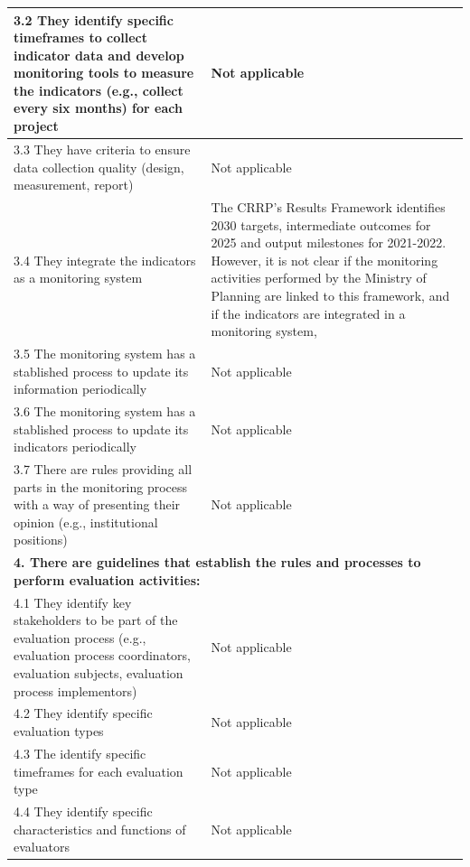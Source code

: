 \documentclass[
  10pt,
]{book}
\begin{document}
\begin{table}
\begin{tabular}[t]{l|l}
\hline
\hspace{1em}3.2 They identify specific timeframes to collect indicator data and develop monitoring tools to measure the indicators (e.g., collect every six months) for each project & Not applicable\\
\hline
\hspace{1em}3.3 They have criteria to ensure data collection quality (design, measurement, report) & Not applicable\\
\hline
\hspace{1em}3.4 They integrate the indicators as a monitoring system & The CRRP’s Results Framework identifies 2030 targets, intermediate outcomes for 2025 and output milestones for 2021-2022. However, it is not clear if the monitoring activities performed by the Ministry of Planning are linked to this framework, and if the indicators are integrated in a monitoring system,\\
\hline
\hspace{1em}3.5 The monitoring system has a stablished process to update its information periodically & Not applicable\\
\hline
\hspace{1em}3.6 The monitoring system has a stablished process to update its indicators periodically & Not applicable\\
\hline
\hspace{1em}3.7 There are rules providing all parts in the monitoring process with a way of presenting their opinion (e.g., institutional positions) & Not applicable\\
\hline
\multicolumn{2}{l}{\textbf{4. There are guidelines that establish the rules and processes to perform evaluation activities:}}\\
\hline
\hspace{1em}4.1 They identify key stakeholders to be part of the evaluation process (e.g., evaluation process coordinators, evaluation subjects, evaluation process implementors) & Not applicable\\
\hline
\hspace{1em}4.2 They identify specific evaluation types & Not applicable\\
\hline
\hspace{1em}4.3 The identify specific timeframes for each evaluation type & Not applicable\\
\hline
\hspace{1em}4.4 They identify specific characteristics and functions of evaluators & Not applicable\\

\end{tabular}
\end{table}
\end{document}
